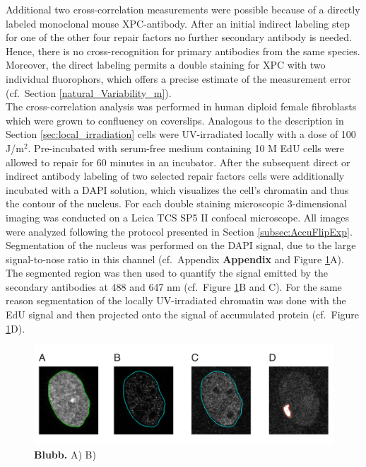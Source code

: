 Additional two cross-correlation measurements were possible because of a directly labeled monoclonal mouse XPC-antibody. After an initial indirect labeling step for one of the other four repair factors no further secondary antibody is needed. Hence, there is no cross-recognition for primary antibodies from the same species. Moreover, the direct labeling permits a double staining for XPC with two individual fluorophors, which offers a precise estimate of the measurement error (cf.\ Section \ref{natural_Variability_m}). \\
The cross-correlation analysis was performed in	human diploid female fibroblasts which were grown to confluency on coverslips. Analogous to the description in Section \ref{sec:local_irradiation} cells were UV-irradiated locally with a dose of 100 J/$\text{m}^\text{2}$. Pre-incubated with serum-free medium containing 10 \textmu M EdU cells were allowed to repair for 60 minutes in an incubator. After the subsequent direct or indirect antibody labeling of two selected repair factors cells were additionally incubated with a DAPI solution, which visualizes the cell's chromatin and thus the contour of the nucleus. For each double staining microscopic 3-dimensional imaging was conducted on a Leica TCS SP5 II confocal microscope. All images were analyzed following the protocol presented in Section \ref{subsec:AccuFlipExp}. Segmentation of the nucleus was performed on the DAPI signal, due to the large signal-to-nose ratio in this channel (cf.\ Appendix \textbf{Appendix} and Figure \ref{fig:coStaining}A). The segmented region was then used to quantify the signal emitted by the secondary antibodies at 488 and 647 nm (cf.\ Figure \ref{fig:coStaining}B and C). For the same reason segmentation of the locally UV-irradiated chromatin was done with the EdU signal and then projected onto the signal of accumulated protein (cf.\ Figure \ref{fig:coStaining}D).   


\begin{figure}[htbp]
	\begin{center}
		\includegraphics[width=1\textwidth]{Abbildungen/figure4_1.pdf}
		\caption{\textbf{Blubb.} A) B) }
		\label{fig:coStaining}
	\end{center}
\end{figure}


